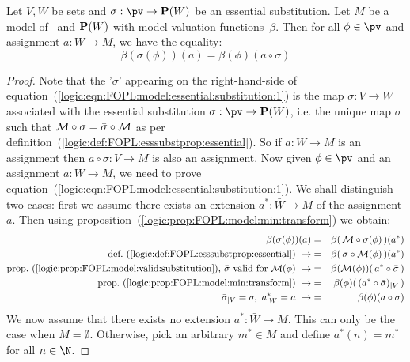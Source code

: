 \begin{theorem}\label{logic:the:FOPL:model:essential:substitution}
Let $V,W$ be sets and $\sigma:\pv\to{\bf P}(W)$ be an essential
substitution. Let $M$ be a model of \pv\ and ${\bf P}(W)$ with model
valuation functions~$\beta$. Then for all $\phi\in\pv$ and
assignment $a:W\to M$, we have the equality:
    \begin{equation}\label{logic:eqn:FOPL:model:essential:substitution:1}
    \beta(\sigma(\phi))(a)=\beta(\phi)(a\circ\sigma)
    \end{equation}
\end{theorem}
\begin{proof}
Note that the '$\sigma$' appearing on the right-hand-side of
equation~(\ref{logic:eqn:FOPL:model:essential:substitution:1}) is
the map $\sigma:V\to W$ associated with the essential substitution
$\sigma:\pv\to{\bf P}(W)$, i.e. the unique map $\sigma$ such that
${\cal M}\circ\sigma=\bar{\sigma}\circ{\cal M}$ as per
definition~(\ref{logic:def:FOPL:esssubstprop:essential}). So if
$a:W\to M$ is an assignment then $a\circ\sigma:V\to M$ is also an
assignment. Now given $\phi\in\pv$ and an assignment $a:W\to M$, we
need to prove
equation~(\ref{logic:eqn:FOPL:model:essential:substitution:1}). We
shall distinguish two cases: first we assume there exists an
extension $a^{*}:\bar{W}\to M$ of the assignment $a$. Then using
proposition~(\ref{logic:prop:FOPL:model:min:transform}) we obtain:
    \begin{eqnarray*}
    \beta(\sigma(\phi))(a)&=&\beta(\,{\cal M}\circ\sigma(\phi)\,)(a^{*})\\
    \mbox{def.~(\ref{logic:def:FOPL:esssubstprop:essential})}\ \rightarrow
    &=&\beta(\,\bar{\sigma}\circ{\cal M}(\phi)\,)(a^{*})\\
    \mbox{prop.~(\ref{logic:prop:FOPL:model:valid:substitution}),
    $\bar{\sigma}$ valid for ${\cal M}(\phi)$}\ \rightarrow
    &=&\beta({\cal M}(\phi))(\,a^{*}\circ\bar{\sigma}\,)\\
    \mbox{prop.~(\ref{logic:prop:FOPL:model:min:transform})}\ \rightarrow
    &=&\beta(\phi)(\,(a^{*}\circ\bar{\sigma})_{|V}\,)\\
    \bar{\sigma}_{|V}=\sigma,\ a^{*}_{|W}=a\ \rightarrow
    &=&\beta(\phi)(a\circ\sigma)\\
    \end{eqnarray*}
We now assume that there exists no extension $a^{*}:\bar{W}\to M$.
This can only be the case when $M=\emptyset$. Otherwise, pick an
arbitrary $m^{*}\in M$ and define $a^{*}(n)=m^{*}$ for all $n\in\N$.

\end{proof}
